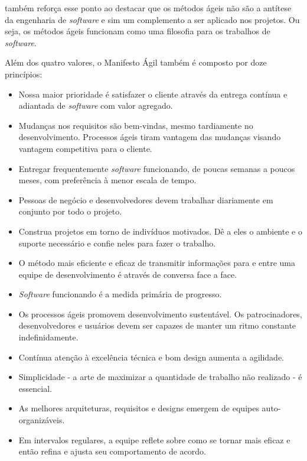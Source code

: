 \documentclass[
    12pt,       %
    openright,      %
    twoside,      %
    a4paper,      %
    english,      %
    french,       %
    spanish,      %
    brazil,       %
    ]{abntex2}
\begin{document}
 também reforça esse ponto ao destacar que os métodos ágeis não são a antítese da engenharia de \textit{software} e sim um complemento a ser aplicado nos projetos. Ou seja, os métodos ágeis funcionam como uma filosofia para os trabalhos de \textit{software}.

Além dos quatro valores, o Manifesto Ágil \cite{AGILEMANIFEST:2001} também é composto por doze princípios: 

\begin{itemize}
        \item Nossa maior prioridade é satisfazer o cliente através da entrega contínua e adiantada de \textit{software} com valor agregado.
        \item Mudanças nos requisitos são bem-vindas, mesmo tardiamente no desenvolvimento. Processos ágeis tiram vantagem das mudanças visando vantagem competitiva para o cliente.
        \item Entregar frequentemente \textit{software} funcionando, de poucas semanas a poucos meses, com preferência à menor escala de tempo.
        \item Pessoas de negócio e desenvolvedores devem trabalhar diariamente em conjunto por todo o projeto.
        \item Construa projetos em torno de indivíduos motivados. Dê a eles o ambiente e o suporte necessário e confie neles para fazer o trabalho.
        \item O método mais eficiente e eficaz de transmitir informações para e entre uma equipe de desenvolvimento é através de conversa face a face.
        \item \textit{Software} funcionando é a medida primária de progresso.
        \item Os processos ágeis promovem desenvolvimento sustentável. Os patrocinadores, desenvolvedores e usuários devem ser capazes de manter um ritmo constante indefinidamente.
        \item Contínua atenção à excelência técnica e bom design aumenta a agilidade.
        \item Simplicidade - a arte de maximizar a quantidade de trabalho não realizado - é essencial.
        \item As melhores arquiteturas, requisitos e designs emergem de equipes auto-organizáveis.
        \item Em intervalos regulares, a equipe reflete sobre como se tornar mais eficaz e então refina e ajusta seu comportamento de acordo.
\end{itemize}
\end{document}
